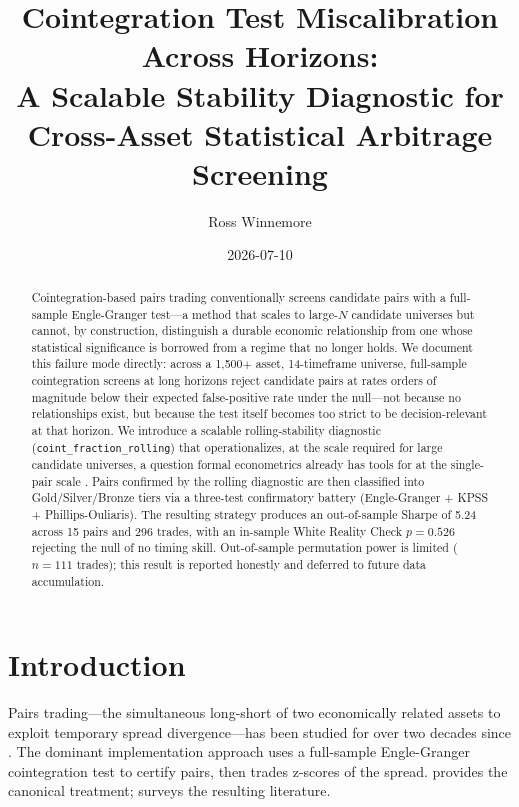 \documentclass[12pt,a4paper]{article}
\title{%
  \textbf{Cointegration Test Miscalibration Across Horizons:}\\
  \large A Scalable Stability Diagnostic for Cross-Asset Statistical Arbitrage Screening
}
\author{Ross Winnemore}
\date{2026-07-10}
\begin{document}
\maketitle

\begin{abstract}
Cointegration-based pairs trading conventionally screens candidate pairs with a
full-sample Engle-Granger test---a method that scales to large-$N$ candidate
universes but cannot, by construction, distinguish a durable economic relationship
from one whose statistical significance is borrowed from a regime that no longer
holds. We document this failure mode directly: across a 1,500$+$ asset, 14-timeframe
universe, full-sample cointegration screens at long horizons reject candidate pairs
at rates orders of magnitude below their expected false-positive rate under the
null---not because no relationships exist, but because the test itself becomes too
strict to be decision-relevant at that horizon. We introduce a scalable
rolling-stability diagnostic (\texttt{coint\_fraction\_rolling}) that
operationalizes, at the scale required for large candidate universes, a question
formal econometrics already has tools for at the single-pair scale
\citep{gregory_hansen1996,hansen1992}. Pairs confirmed by the rolling diagnostic
are then classified into Gold/Silver/Bronze tiers via a three-test confirmatory
battery (Engle-Granger + KPSS + Phillips-Ouliaris). The resulting strategy
produces an out-of-sample Sharpe of 5.24 across 15 pairs
and 296 trades, with an in-sample White Reality Check
$p = 0.526$ rejecting the null of no timing skill. Out-of-sample
permutation power is limited ($n=111$ trades); this result is reported honestly and
deferred to future data accumulation.
\end{abstract}

\tableofcontents
\newpage

\section{Introduction}

Pairs trading---the simultaneous long-short of two economically related assets to
exploit temporary spread divergence---has been studied for over two decades since
\citet{gatev2006}. The dominant implementation approach uses a full-sample
Engle-Granger cointegration test \citep{engle_granger1987} to certify pairs, then
trades z-scores of the spread. \citet{vidyamurthy2004} provides the canonical
treatment; \citet{krauss2017} surveys the resulting literature.
\end{document}
